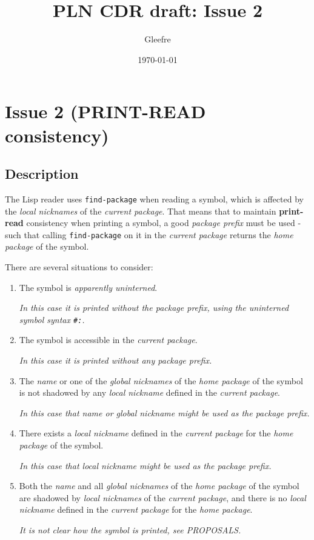 \documentclass[11pt]{article}
\author{Gleefre}
\date{\today}
\title{PLN CDR draft: Issue 2}
\begin{document}
\maketitle

\section{Issue 2 (PRINT-READ consistency)}
\label{sec:org564adcb}
\subsection{Description}
\label{sec:org4b0dbbe}
The Lisp reader uses \texttt{find-package} when reading a symbol, which is affected by the
\emph{local nicknames} of the \emph{current package}. That means that to maintain \textbf{print-read}
consistency when printing a symbol, a good \emph{package prefix} must be used - such that
calling \texttt{find-package} on it in the \emph{current package} returns the \emph{home package} of
the symbol.

There are several situations to consider:
\begin{enumerate}
\item The symbol is \emph{apparently uninterned}.

\emph{In this case it is printed without the package prefix, using the uninterned
symbol syntax \texttt{\#:}.}

\item The symbol is accessible in the \emph{current package}.

\emph{In this case it is printed without any package prefix.}

\item The \emph{name} or one of the \emph{global nicknames} of the \emph{home package} of the symbol
is not shadowed by any \emph{local nickname} defined in the \emph{current package}.

\emph{In this case that name or global nickname might be used as the package prefix.}

\item There exists a \emph{local nickname} defined in the \emph{current package} for the \emph{home
package} of the symbol.

\emph{In this case that local nickname might be used as the package prefix.}

\item Both the \emph{name} and all \emph{global nicknames} of the \emph{home package} of the symbol
are shadowed by \emph{local nicknames} of the \emph{current package}, and there is no
\emph{local nickname} defined in the \emph{current package} for the \emph{home package}.

\emph{It is not clear how the symbol is printed, see PROPOSALS.}
\end{enumerate}
\end{document}
